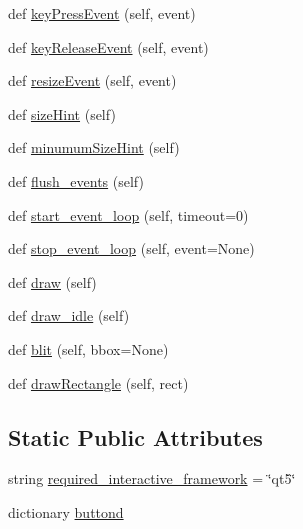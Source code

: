 \begin{DoxyCompactItemize}
def \hyperlink{classmatplotlib_1_1backends_1_1backend__qt5_1_1FigureCanvasQT_a9a285823308563aae9549d63d3bf9035}{key\+Press\+Event} (self, event)
\item 
def \hyperlink{classmatplotlib_1_1backends_1_1backend__qt5_1_1FigureCanvasQT_abd282f9125fe682ff139f1ac02e8a8f4}{key\+Release\+Event} (self, event)
\item 
def \hyperlink{classmatplotlib_1_1backends_1_1backend__qt5_1_1FigureCanvasQT_a511998731594ee5103b2d964feeede37}{resize\+Event} (self, event)
\item 
def \hyperlink{classmatplotlib_1_1backends_1_1backend__qt5_1_1FigureCanvasQT_a442b8b8905d123ae0d14bb569dd51f27}{size\+Hint} (self)
\item 
def \hyperlink{classmatplotlib_1_1backends_1_1backend__qt5_1_1FigureCanvasQT_a6d909f022590eb7bf4486b33cb0ab489}{minumum\+Size\+Hint} (self)
\item 
def \hyperlink{classmatplotlib_1_1backends_1_1backend__qt5_1_1FigureCanvasQT_aeb804aea6ec5ff626d667102f7ea0324}{flush\+\_\+events} (self)
\item 
def \hyperlink{classmatplotlib_1_1backends_1_1backend__qt5_1_1FigureCanvasQT_a2733957067b8dbd6378aff27a2d94990}{start\+\_\+event\+\_\+loop} (self, timeout=0)
\item 
def \hyperlink{classmatplotlib_1_1backends_1_1backend__qt5_1_1FigureCanvasQT_aa3d02035027ba6981e012951bc10c983}{stop\+\_\+event\+\_\+loop} (self, event=None)
\item 
def \hyperlink{classmatplotlib_1_1backends_1_1backend__qt5_1_1FigureCanvasQT_aff9bad2fadc8d09297ecb0975ceb51e8}{draw} (self)
\item 
def \hyperlink{classmatplotlib_1_1backends_1_1backend__qt5_1_1FigureCanvasQT_aa0ab0ffaee39c240a2570bfcfc536b60}{draw\+\_\+idle} (self)
\item 
def \hyperlink{classmatplotlib_1_1backends_1_1backend__qt5_1_1FigureCanvasQT_ad7e244e2149012522217c38dc4de6575}{blit} (self, bbox=None)
\item 
def \hyperlink{classmatplotlib_1_1backends_1_1backend__qt5_1_1FigureCanvasQT_a56d2e1e4076dc66f1f2a09dbe2487b3d}{draw\+Rectangle} (self, rect)
\end{DoxyCompactItemize}
\subsection*{Static Public Attributes}
\begin{DoxyCompactItemize}
\item 
string \hyperlink{classmatplotlib_1_1backends_1_1backend__qt5_1_1FigureCanvasQT_ab8e47d914f438ec608a9293355800851}{required\+\_\+interactive\+\_\+framework} = \char`\"{}qt5\char`\"{}
\item 
dictionary \hyperlink{classmatplotlib_1_1backends_1_1backend__qt5_1_1FigureCanvasQT_a4c1d0609a6db2e14aacc9e1d9e1f6322}{buttond}
\end{DoxyCompactItemize}


